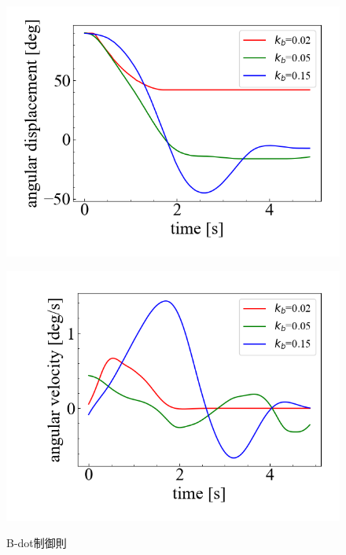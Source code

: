 \begin{figure}[h]
	\centering
	\begin{minipage}{0.43\columnwidth}
	  \centering
	  \includegraphics[width=\columnwidth]{./figure/kb5deg.png}
	  \label{fig:bdotdeg}
	\end{minipage}
	\hspace{5mm}
	\begin{minipage}{0.43\columnwidth}
	  \centering
	  \includegraphics[width=\columnwidth]{./figure/kb5degpers.png}
	  \label{fig:bdotdegpers}
	\end{minipage}
	\caption{B-dot制御則}
	\label{fig:bdot}
\end{figure}

